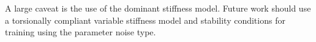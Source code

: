 A large caveat is the use of the dominant stiffness model. Future work should use a torsionally compliant variable stiffness model and stability conditions for training using the parameter noise type. 


%
%



%
%



